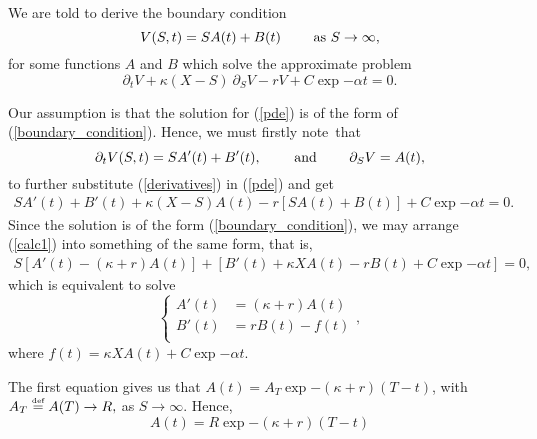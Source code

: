 \noindent We are told to derive the boundary condition 
	\begin{equation}\label{boundary_condition}
		V(S, t) = S A(t) + B(t) \quad\quad \text{ as } S\to \infty,
	\end{equation}
for some functions $A$ and $B$ which solve the approximate problem
	\begin{equation}\label{pde}
		\partial_t V + \kappa (X - S) \ \partial_S V - rV + C \exp{-\alpha t} = 0.
	\end{equation}

Our assumption is that the solution for (\ref{pde}) is of the form of (\ref{boundary_condition}). Hence, we must firstly note~that
	\begin{equation}\label{derivatives}
		\partial_t V (S, t) = S A'(t) + B'(t), \quad\quad \text{ and } \quad\quad \partial_S V = A(t),
	\end{equation}
to further substitute (\ref{derivatives}) in (\ref{pde}) and get
	\begin{equation}\label{calc1}
		\begin{aligned}
			S A'(t) + B'(t) + \kappa (X - S) A(t) - r \left[ S A(t) + B(t)\right] + C\exp{-\alpha t} = 0.
		\end{aligned}
	\end{equation}
Since the solution is of the form (\ref{boundary_condition}), we may arrange (\ref{calc1}) into something of the same form, that is,
	\begin{equation}\label{calc2}
		\begin{aligned}
			S \left[A'(t) - (\kappa + r) A(t) \right] + \left[ B'(t) + \kappa X A(t) - rB(t) + C\exp{-\alpha t}\right] = 0,
		\end{aligned}
	\end{equation}
which is equivalent to solve
	\begin{equation}
		\begin{cases}
			A'(t) &=  (\kappa + r) A(t) \\
			B'(t) &= rB(t)  - f(t) \\
		\end{cases},
	\end{equation}
where $f(t) = \kappa X A(t) + C\exp{-\alpha t}$.

The first equation gives us that $A(t) = A_T \exp{-(\kappa + r)(T-t)}$, with 
$
A_T \overset{\text{\tiny def}}{=} A(T) \to R,
$ 
as $S\to\infty$. Hence, 
\begin{equation}
	A(t) = R\exp{-(\kappa + r)(T-t)}
\end{equation} 

